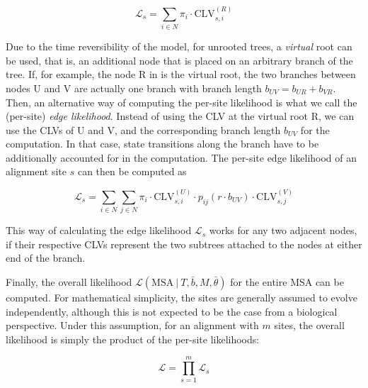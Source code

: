 \begin{equation}
    \label{ch:Foundations:sec:MLTreeInference:eq:root_site_likelihood}
    \mathcal{L}_{s} = \sum_{i \in N} \pi_i \cdot \mbox{CLV}^{(R)}_{s,i}
\end{equation}

Due to the time reversibility of the model, for unrooted trees, a \emph{virtual} root can be used,
that is, an additional node that is placed on an arbitrary branch of the tree.
If, for example, the node {\sffamily R} in  is the virtual root,
the two branches between nodes {\sffamily U} and {\sffamily V}
are actually one branch with branch length $b_{UV} = b_{UR} + b_{VR}$.
Then, an alternative way of computing the per-site likelihood is what we call the (per-site) \emph{edge likelihood}.
Instead of using the CLV at the virtual root {\sffamily R}, we can use the CLVs of {\sffamily U} and {\sffamily V},
and the corresponding branch length $b_{UV}$ for the computation.
In that case, state transitions along the branch have to be additionally accounted for in the computation.
The per-site edge likelihood of an alignment site $s$ can then be computed as

\begin{equation}
    \label{ch:Foundations:sec:MLTreeInference:eq:edge_likelihood}
    \mathcal{L}_{s} = \sum_{i \in N} \sum_{j \in N} \pi_i \cdot \mbox{CLV}^{(U)}_{s,i} \cdot
    p_{ij}(r \cdot b_{UV}) \cdot \mbox{CLV}^{(V)}_{s,j}
\end{equation}

This way of calculating the edge likelihood $\mathcal{L}_s$ works for any two adjacent nodes,
if their respective CLVs represent the two subtrees attached to the nodes at either end of the branch.

Finally, the overall likelihood $\mathcal{L}( \mbox{MSA} ~|~ T, \bar{b}, M, \bar{\theta} )$
for the entire MSA can be computed.
For mathematical simplicity, the sites are generally assumed to evolve independently,
although this is not expected to be the case from a biological perspective.
Under this assumption, for an alignment with $m$ sites,
the overall likelihood is simply the product of the per-site likelihoods:

\begin{equation}
    \label{ch:Foundations:sec:MLTreeInference:eq:root_likelihood}
    \mathcal{L} = \prod_{s=1}^{m} \mathcal{L}_s
\end{equation}

